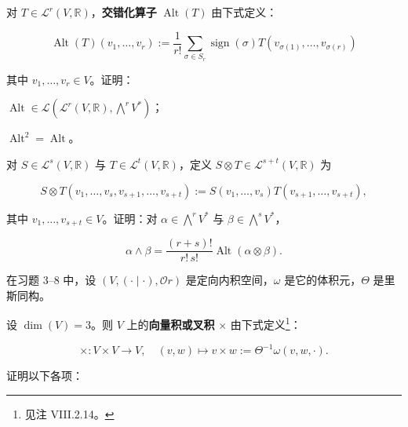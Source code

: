 \exerciseshead

\begin{exercises}
\item

对 $ T \in \mathcal{L}^{r}(V,\mathbb{R}) $，\textbf{交错化算子} $ \operatorname{Alt}(T) $ 由下式定义：

\[
\operatorname{Alt}(T)(v_{1},\ldots,v_{r}) := \frac{1}{r!}\sum_{\sigma\in S_{r}}\operatorname{sign}(\sigma)T(v_{\sigma(1)},\ldots,v_{\sigma(r)})
\]

其中 $ v_{1},\ldots,v_{r} \in V $。证明：

\begin{items}
\item

$ \operatorname{Alt} \in \mathcal{L}(\mathcal{L}^{r}(V,\mathbb{R}),\bigwedge^{r}V^{*}) $；

\item

$ \operatorname{Alt}^{2} = \operatorname{Alt} $。

\end{items}

\item

对 $ S \in \mathcal{L}^{s}(V,\mathbb{R}) $ 与 $ T \in \mathcal{L}^{t}(V,\mathbb{R}) $，定义 $ S\otimes T \in \mathcal{L}^{s+t}(V,\mathbb{R}) $ 为

\[
S\otimes T(v_{1},\ldots,v_{s},v_{s+1},\ldots,v_{s+t}) := S(v_{1},\ldots,v_{s})T(v_{s+1},\ldots,v_{s+t}),
\]

其中 $ v_{1},\ldots,v_{s+t} \in V $。证明：对 $ \alpha \in \bigwedge^{r}V^{*} $ 与 $ \beta \in \bigwedge^{s}V^{*} $，

\[
\alpha\wedge\beta = \frac{(r+s)!}{r!\,s!}\operatorname{Alt}(\alpha\otimes\beta).
\]

在习题 3–8 中，设 $ (V,(\cdot\mid\cdot),\mathcal{O}r) $ 是定向内积空间，$ \omega $ 是它的体积元，$ \Theta $ 是里斯同构。

\item

设 $ \dim(V) = 3 $。则 $ V $ 上的\textbf{向量积或叉积} $ \times $ 由下式定义\footnote{见注 VIII.2.14。}：

\[
\times: V\times V \to V, \quad (v,w)\mapsto v\times w := \Theta^{-1}\omega(v,w,\cdot).
\]

证明以下各项：

\begin{items}
\item


\end{items}
\end{exercises}
